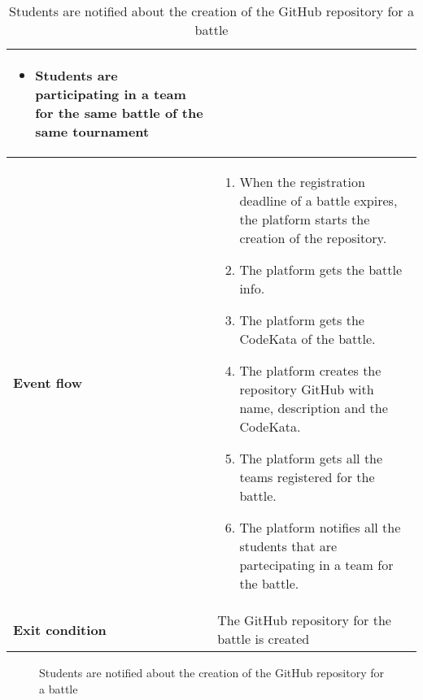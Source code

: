 \begin{enumerate}[label=\textbf{UC\arabic*}:,ref=UC\arabic*,leftmargin=1.3cm]
{\begin{table}[H]
\begin{tabular}{|l|p{11.9cm}|}
                        \begin{itemize}
                              \item Students are participating in a team for the same battle of the same tournament
                        \end{itemize}                                                \\\hline
                        \textbf{Event flow}      &
                        \begin{enumerate}[label=\arabic*.]
                              \item When the registration deadline of a battle expires, the platform starts the creation of the repository.
                              \item The platform gets the battle info.
                              \item The platform gets the CodeKata of the battle.
                              \item The platform creates the repository GitHub with name, description and the CodeKata.
                              \item The platform gets all the teams registered for the battle.
                              \item The platform notifies all the students that are partecipating in a team for the battle.
                        \end{enumerate}                        \\\hline
                        \textbf{Exit condition}  & The GitHub repository for the battle is created                                                          \\\hline
                  \end{tabular}
                  \caption{Students are notified about the creation of the GitHub repository for a battle  }
                  \label{table:Students are notified about the creation of the GitHub repository for a battle}
            \end{table}
            \begin{figure}[H]
                  \centering
                  \caption{Students are notified about the creation of the GitHub repository for a battle}
                  \label{fig:Students are notified about the creation of the GitHub repository for a battle}

\end{figure}}
\end{enumerate}
